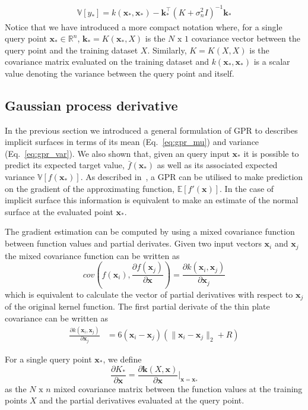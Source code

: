 \begin{eqnarray}
\label{eq:gpr_var}
\mathbb{V}[y_*]=k(\mathbf{x}_*,\mathbf{x}_*)-\mathbf{k}_*^\top(K+\sigma_n^2I)^{-1}\mathbf{k}_*
\end{eqnarray}
Notice that we have introduced a more compact notation where, for a single query point $\mathbf{x}_*\in\mathbb{R}^n$, $\mathbf{k}_*=K(\mathbf{x}_*,X)$ is the $N\text{ x }1$ covariance vector between the query point and the training dataset $X$. Similarly, $K=K(X,X)$ is the covariance matrix evaluated on the training dataset and $k(\mathbf{x}_*,\mathbf{x}_*)$ is a scalar value denoting the variance between the query point and itself.

\subsection{Gaussian process derivative}

In the previous section we introduced a general formulation of GPR to describes implicit surfaces in terms of its mean (Eq.~\ref{eq:gpr_mu}) and variance (Eq.~\ref{eq:gpr_var}). We also shown that, given an query input $\mathbf{x}_*$ it is possible to predict its expected target value, $\bar{f}(\mathbf{x}_*)$ as well as its associated expected variance $\mathbb{V}[f(\mathbf{x}_*)]$. As described in~\cite{Rasmussen2006Gaussian}, a GPR can be utilised to make prediction on the gradient of the approximating function, $\mathbb{E}[f'(\mathbf{x})]$. In the case of implicit surface this information is equivalent to make an estimate of the normal surface at the evaluated point $\mathbf{x}_*$.

The gradient estimation can be computed by using a mixed covariance function between function values and partial derivates. Given two input vectors $\mathbf{x}_i$ and $\mathbf{x}_j$ the mixed covariance function can be written as
$$
cov(f(\mathbf{x}_i), \frac{\partial f(\mathbf{x}_j)}{\partial\mathbf{x}})=\frac{\partial k(\mathbf{x}_i, \mathbf{x}_j)}{\partial\mathbf{x}_j}
$$
which is equivalent to calculate the vector of partial derivatives with respect to $\mathbf{x}_j$ of the original kernel function. The first partial derivate of the thin plate covariance can be written as
\begin{eqnarray}
\label{eq:gpr_der} 
\frac{\partial k(\mathbf{x}_i,\mathbf{x}_j)}{\partial\mathbf{x}_j}&=6(\mathbf{x}_i-\mathbf{x}_j)(\|\mathbf{x}_i-\mathbf{x}_j\|_2 + R)
\end{eqnarray}

For a single query point $\mathbf{x}_*$, we define 
$$
\frac{\partial K_*}{\partial\mathbf{x}}=\frac{\partial\mathbf{k}(X,\mathbf{x})}{\partial\mathbf{x}}\bigg|_{\mathbf{x}=\mathbf{x}_*}
$$ 
as the $N\text{ x }n$ mixed covariance matrix between the function values at the training points $X$ and the partial derivatives evaluated at the query point. 

